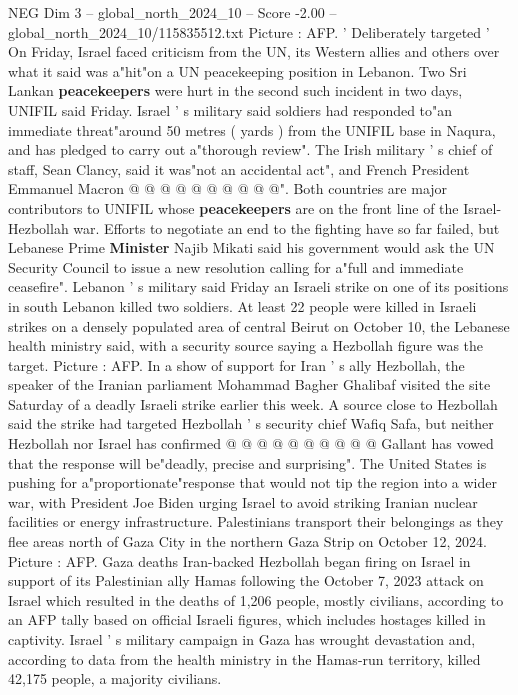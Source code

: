 \begin{textsample}{NEG Dim 3 – global\_north\_2024\_10 – Score -2.00 – global\_north\_2024\_10/115835512.txt}
Picture : AFP. ' Deliberately targeted ' On Friday, Israel faced criticism from the UN, its Western allies and others over what it said was a"hit"on a UN peacekeeping position in Lebanon.
Two Sri Lankan \textbf{peacekeepers} were hurt in the second such incident in two days, UNIFIL said Friday.
Israel ' s military said soldiers had responded to"an immediate threat"around 50 metres ( yards ) from the UNIFIL base in Naqura, and has pledged to carry out a"thorough review".
The Irish military ' s chief of staff, Sean Clancy, said it was"not an accidental act", and French President Emmanuel Macron @ @ @ @ @ @ @ @ @ @".
Both countries are major contributors to UNIFIL whose \textbf{peacekeepers} are on the front line of the Israel-Hezbollah war.
Efforts to negotiate an end to the fighting have so far failed, but Lebanese Prime \textbf{Minister} Najib Mikati said his government would ask the UN Security Council to issue a new resolution calling for a"full and immediate ceasefire".
Lebanon ' s military said Friday an Israeli strike on one of its positions in south Lebanon killed two soldiers.
At least 22 people were killed in Israeli strikes on a densely populated area of central Beirut on October 10, the Lebanese health ministry said, with a security source saying a Hezbollah figure was the target.
Picture : AFP.
In a show of support for Iran ' s ally Hezbollah, the speaker of the Iranian parliament Mohammad Bagher Ghalibaf visited the site Saturday of a deadly Israeli strike earlier this week.
A source close to Hezbollah said the strike had targeted Hezbollah ' s security chief Wafiq Safa, but neither Hezbollah nor Israel has confirmed @ @ @ @ @ @ @ @ @ @ Gallant has vowed that the response will be"deadly, precise and surprising".
The United States is pushing for a"proportionate"response that would not tip the region into a wider war, with President Joe Biden urging Israel to avoid striking Iranian nuclear facilities or energy infrastructure.
Palestinians transport their belongings as they flee areas north of Gaza City in the northern Gaza Strip on October 12, 2024.
Picture : AFP.
Gaza deaths Iran-backed Hezbollah began firing on Israel in support of its Palestinian ally Hamas following the October 7, 2023 attack on Israel which resulted in the deaths of 1,206 people, mostly civilians, according to an AFP tally based on official Israeli figures, which includes hostages killed in captivity.
Israel ' s military campaign in Gaza has wrought devastation and, according to data from the health ministry in the Hamas-run territory, killed 42,175 people, a majority civilians.

\end{textsample}
